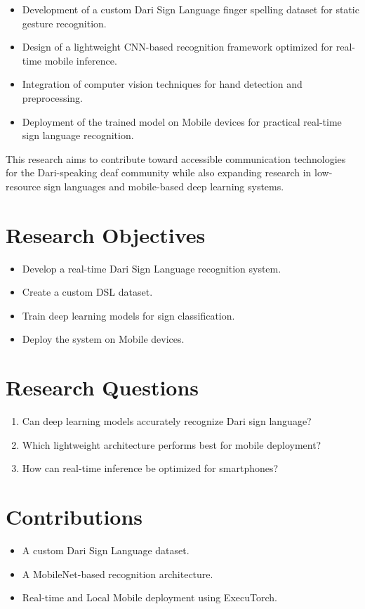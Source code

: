 \begin{itemize}
	\item Development of a custom Dari Sign Language finger spelling dataset for static gesture recognition.
	\item Design of a lightweight CNN-based recognition framework optimized for real-time mobile inference.
	\item Integration of computer vision techniques for hand detection and preprocessing.
	\item Deployment of the trained model on Mobile devices for practical real-time sign language recognition.
\end{itemize}

This research aims to contribute toward accessible communication technologies for the Dari-speaking deaf community while also expanding research in low-resource sign languages and mobile-based deep learning systems.


\section{Research Objectives}
\begin{itemize}
	\item Develop a real-time Dari Sign Language recognition system.
	\item Create a custom DSL dataset.
	\item Train deep learning models for sign classification.
	\item Deploy the system on Mobile devices.
\end{itemize}

\section{Research Questions}
\begin{enumerate}
	\item Can deep learning models accurately recognize Dari sign language?
	\item Which lightweight architecture performs best for mobile deployment?
	\item How can real-time inference be optimized for smartphones?
\end{enumerate}

\section{Contributions}
\begin{itemize}
	\item A custom Dari Sign Language dataset.
	\item A MobileNet-based recognition architecture.
	\item Real-time and Local Mobile deployment using ExecuTorch.
\end{itemize}


